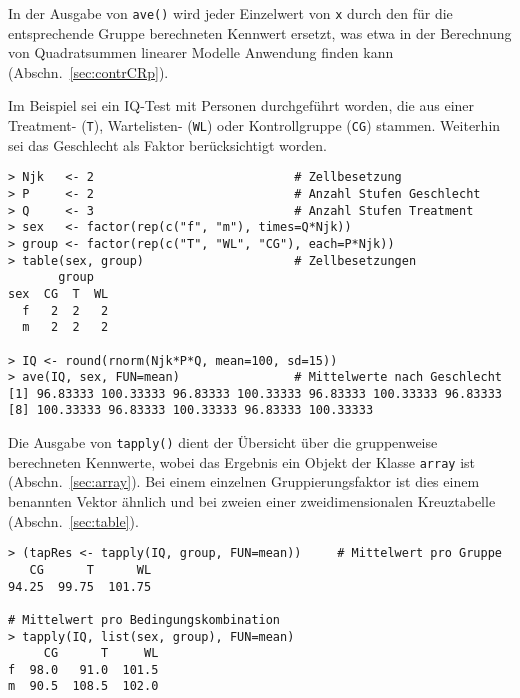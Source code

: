 In der Ausgabe von \lstinline!ave()! wird jeder Einzelwert von \lstinline!x! durch den für die entsprechende Gruppe berechneten Kennwert ersetzt, was etwa in der Berechnung von Quadratsummen linearer Modelle Anwendung finden kann (Abschn.\ \ref{sec:contrCRp}).

Im Beispiel sei ein IQ-Test mit Personen durchgeführt worden, die aus einer Treatment- (\lstinline!T!), Wartelisten- (\lstinline!WL!) oder Kontrollgruppe (\lstinline!CG!) stammen. Weiterhin sei das Geschlecht als Faktor berücksichtigt worden.
\begin{lstlisting}
> Njk   <- 2                            # Zellbesetzung
> P     <- 2                            # Anzahl Stufen Geschlecht
> Q     <- 3                            # Anzahl Stufen Treatment
> sex   <- factor(rep(c("f", "m"), times=Q*Njk))
> group <- factor(rep(c("T", "WL", "CG"), each=P*Njk))
> table(sex, group)                     # Zellbesetzungen
       group
sex  CG  T  WL
  f   2  2   2
  m   2  2   2

> IQ <- round(rnorm(Njk*P*Q, mean=100, sd=15))
> ave(IQ, sex, FUN=mean)                # Mittelwerte nach Geschlecht
[1] 96.83333 100.33333 96.83333 100.33333 96.83333 100.33333 96.83333
[8] 100.33333 96.83333 100.33333 96.83333 100.33333
\end{lstlisting}

Die Ausgabe von \lstinline!tapply()! dient der Übersicht über die gruppenweise berechneten Kennwerte, wobei das Ergebnis ein Objekt der Klasse \lstinline!array! ist (Abschn.\ \ref{sec:array}). Bei einem einzelnen Gruppierungsfaktor ist dies einem benannten Vektor ähnlich und bei zweien einer zweidimensionalen Kreuztabelle (Abschn.\ \ref{sec:table}).
\begin{lstlisting}
> (tapRes <- tapply(IQ, group, FUN=mean))     # Mittelwert pro Gruppe
   CG      T      WL
94.25  99.75  101.75

# Mittelwert pro Bedingungskombination
> tapply(IQ, list(sex, group), FUN=mean)
     CG      T     WL
f  98.0   91.0  101.5
m  90.5  108.5  102.0
\end{lstlisting}



